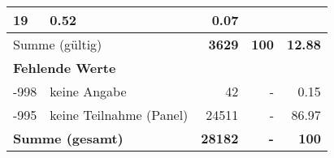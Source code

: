 \begin{longtable}{lXrrr}
       \num{19} &
       \num[round-mode=places,round-precision=2]{0.52} &
         \num[round-mode=places,round-precision=2]{0.07} \\
     \midrule
     \multicolumn{2}{l}{Summe (gültig)} &
       \textbf{\num{3629}} &
     \textbf{100} &
       \textbf{\num[round-mode=places,round-precision=2]{12.88}} \\
     \multicolumn{5}{l}{\textbf{Fehlende Werte}}\\
       -998 &
       keine Angabe &
         \num{42} &
        - &
         \num[round-mode=places,round-precision=2]{0.15} \\
       -995 &
       keine Teilnahme (Panel) &
         \num{24511} &
        - &
         \num[round-mode=places,round-precision=2]{86.97} \\
     \midrule
     \multicolumn{2}{l}{\textbf{Summe (gesamt)}} &
          \textbf{\num{28182}} &
        \textbf{-} &
        \textbf{100} \\
     \bottomrule
     \end{longtable}
     
